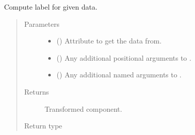 \documentclass[letterpaper,10pt,english]{sphinxmanual}
\begin{document}
\begin{fulllineitems}
\begin{fulllineitems}
\label{\detokenize{api/base_classes:geology.src.base_spatial.SpatialComponent.label}}
Compute label for given data.
\begin{quote}\begin{description}
\item[{Parameters}] \leavevmode\begin{itemize}
\item {} 
 (\sphinxstyleliteralemphasis{\sphinxupquote{, }}) \textendash{} Attribute to get the data from.

\item {} 
 () \textendash{} Any additional positional arguments to .

\item {} 
 () \textendash{} Any additional named arguments to .

\end{itemize}

\item[{Returns}] \leavevmode
{} \textendash{} Transformed component.

\item[{Return type}] \leavevmode
{\hyperref[\detokenize{api/base_classes:geology.src.base_spatial.SpatialComponent}]{}}

\end{description}\end{quote}

\end{fulllineitems}



\end{fulllineitems}
\end{document}

